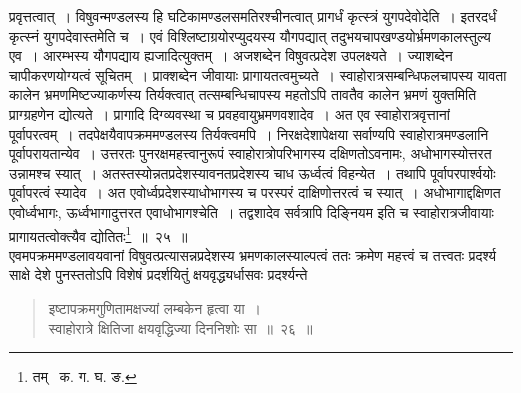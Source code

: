 \documentclass[11pt, openany]{book}
\begin{document}
\newpage

\noindent प्रवृत्तत्वात्~। विषुवन्मण्डलस्य हि घटिकामण्डलसमतिरश्चीनत्वात् प्रागर्धं कृत्स्त्रं युगपदेवोदेति~। इतरदर्धं कृत्स्नं युगपदेवास्तमेति च~। एवं विश्लिष्टाग्रयोरप्युदयस्य यौगपद्यात् तदुभयचापखण्डयोर्भ्रमणकालस्तुल्य एव~। आरम्भस्य यौगपद्याय ह्यजादित्युक्तम्~। अजशब्देन विषुवत्प्रदेश उपलक्ष्यते~। ज्याशब्देन चापीकरणयोग्यत्वं सूचितम्~। प्राक्शब्देन जीवायाः प्रागायतत्वमुच्यते~। स्वाहोरात्रसम्बन्धिफलचापस्य यावता कालेन भ्रमणमिष्टज्याकर्णस्य तिर्यक्त्वात् तत्सम्बन्धिचापस्य महतोऽपि तावतैव कालेन भ्रमणं युक्तमिति प्राग्ग्रहणेन द्योत्यते~। प्रागादि दिग्व्यवस्था च प्रवहवायुभ्रमणवशादेव~। अत एव स्वाहोरात्रवृत्तानां पूर्वापरत्वम्~। तदपेक्षयैवापक्रममण्डलस्य तिर्यक्त्वमपि~। निरक्षदेशापेक्षया सर्वाण्यपि स्वाहोरात्रमण्डलानि पूर्वापरायतान्येव~। उत्तरतः पुनरक्षमहत्त्वानुरूपं स्वाहोरात्रोपरिभागस्य दक्षिणतोऽवनामः,
अधोभागस्योत्तरत उन्नामश्च स्यात्~। अतस्तस्योन्नतप्रदेशस्यावनतप्रदेशस्य चाध ऊर्ध्वत्वं विहन्येत~। तथापि पूर्वापरपार्श्वयोः पूर्वापरत्वं स्यादेव~। अत एवोर्ध्वप्रदेशस्याधोभागस्य च परस्परं दाक्षिणोत्तरत्वं च स्यात्~। अधोभागाद्दक्षिणत एवोर्ध्वभागः, ऊर्ध्वभागादुत्तरत एवाधोभागश्चेति~।
तद्वशादेव सर्वत्रापि दिङ्नियम इति च स्वाहोरात्रजीवायाः प्रागायतत्वोक्त्यैव द्योतितः\renewcommand{\thefootnote}{१}\footnote{तम् \textendash\ क. ग. घ. ङ.}~॥~२५~॥ \\


\indent एवमपक्रममण्डलावयवानां विषुवत्प्रत्यासन्नप्रदेशस्य भ्रमणकालस्याल्पत्वं ततः क्रमेण महत्त्वं च तत्त्वतः प्रदर्श्य साक्षे देशे पुनस्ततोऽपि
विशेषं प्रदर्शयितुं क्षयवृद्ध्यर्धासवः प्रदर्श्यन्ते\textendash 
\begin{quote}
{\ab इष्टापक्रमगुणितामक्षज्यां लम्बकेन हृत्वा या~। \\
 स्वाहोरात्रे क्षितिजा क्षयवृद्धिज्या दिननिशोः सा~॥~२६~॥} 
\end{quote}

\newpage
\end{document}
